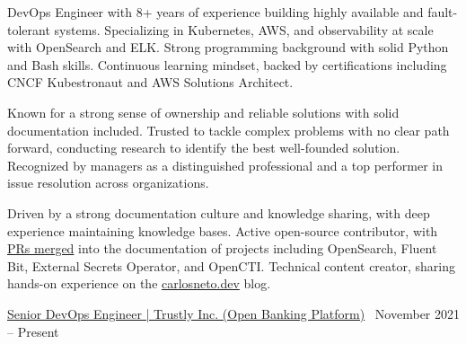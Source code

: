 \documentclass[10pt,a4paper]{altacv}
\begin{document}



\makecvheader

\small

\bigskip
\bigskip


DevOps Engineer with 8+ years of experience building highly available and fault-tolerant systems. Specializing in Kubernetes, AWS, and observability at scale with OpenSearch and ELK. Strong programming background with solid Python and Bash skills. Continuous learning mindset, backed by certifications including CNCF Kubestronaut and AWS Solutions Architect.

\medskip

Known for a strong sense of ownership and reliable solutions with solid documentation included. Trusted to tackle complex problems with no clear path forward, conducting research to identify the best well-founded solution. Recognized by managers as a distinguished professional and a top performer in issue resolution across organizations.

\medskip

Driven by a strong documentation culture and knowledge sharing, with deep experience maintaining knowledge bases. Active open-source contributor, with \href{https://carlosneto.dev/whoami/#opensource-contributions}{PRs merged} into the documentation of projects including OpenSearch, Fluent Bit, External Secrets Operator, and OpenCTI. Technical content creator, sharing hands-on experience on the \href{https://www.carlosneto.dev/}{carlosneto.dev} blog.


\bigskip
\bigskip


\medskip

{\large \href{https://us.trustly.com/}{Senior DevOps Engineer | Trustly Inc. (Open Banking Platform)}} \hfill \faCalendar \ November 2021 -- Present
\end{document}
